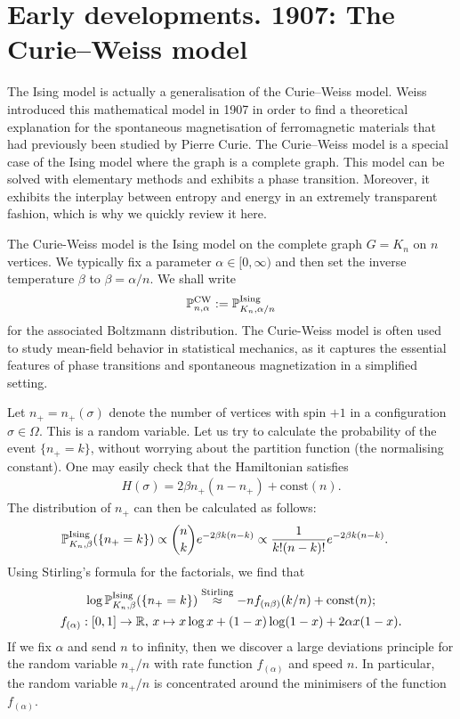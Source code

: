 \section{Early developments. 1907: The Curie--Weiss model}
\label{sec:definitions_examples}

The Ising model is actually a generalisation of the Curie--Weiss model.
Weiss introduced this mathematical model in 1907 in order to find a theoretical
explanation for the spontaneous magnetisation of ferromagnetic materials
that had previously been studied by Pierre Curie.
The Curie--Weiss model is a special case of the Ising model
where the graph is a complete graph.
This model can be solved with elementary methods
and exhibits a phase transition.
Moreover, it exhibits the interplay between entropy and energy in an
extremely transparent fashion,
which is why we quickly review it here.

\begin{definition}
    The Curie-Weiss model is the Ising model on the complete graph \( G=K_n \) on \( n \) vertices.
    We typically fix a parameter $\alpha\in[0,\infty)$ and then set the inverse temperature $\beta$ to $\beta=\alpha/n$.
    We shall write
    \[\P^{\operatorname{CW}}_{n,\alpha}:=\P^{\operatorname{Ising}}_{K_n,\alpha/n}\]
    for the associated Boltzmann distribution.
    The Curie-Weiss model is often used to study mean-field behavior in statistical mechanics, as it captures the essential features of phase transitions and spontaneous magnetization in a simplified setting.
\end{definition}

Let $n_+=n_+(\sigma)$ denote the number of vertices with spin $+1$ in a configuration $\sigma\in\Omega$.
This is a random variable.
Let us try to calculate the probability of the event $\{n_+=k\}$,
without worrying about the partition function (the normalising constant).
One may easily check that
the Hamiltonian satisfies
\begin{align}
    H(\sigma)=2\beta n_+(n-n_+) + \text{const}(n).
\end{align}
The distribution of $n_+$ can then be calculated as follows:
\begin{align}
    \label{eq:CurieWeissDistribution}
    \P_{K_n,\beta}^{\operatorname{Ising}}(\{n_+ = k\}) &\propto \binom{n}{k} e^{-2\beta  k(n-k)}
    \propto \frac1{k! (n-k)!} e^{-2\beta k (n-k)}.
\end{align}
Using Stirling's formula for the factorials, we find that
\begin{gather}
    \log\P_{K_n,\beta}^{\operatorname{Ising}}(\{n_+ = k\}) 
    \stackrel{\text{Stirling}}{\approx}
    -n f_{(n\beta)}(k/n) + \text{const}(n);
    \\
    f_{(\alpha)}:[0,1]\to\R,\,
    x\mapsto x \log x + (1-x)\log (1-x) + 2 \alpha x (1-x).
\end{gather}
If we fix $\alpha$ and send $n$ to infinity, then 
we discover a large deviations principle for the random variable $n_+/n$
with rate function $f_{(\alpha)}$ and speed $n$.
In particular, the random variable $n_+/n$ is concentrated
around the minimisers of the function $f_{(\alpha)}$.

